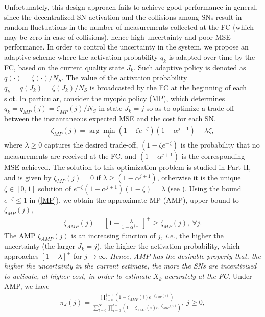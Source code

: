 \documentclass[10pt,twocolumn,twoside]{IEEEtran}
\theoremstyle{plain}
\begin{document}
 
 Unfortunately, this design approach
 fails to achieve good performance in general,
since the decentralized SN activation and the collisions among SNs result in
random fluctuations in the number of measurements collected at the FC (which may be zero in case of collisions),
hence high uncertainty and poor MSE performance.
In order to control the uncertainty in the system, we propose an adaptive scheme
   where the activation probability $q_k$ is adapted over time by the FC, based on the current quality
  state $J_k$. Such adaptive policy is denoted as $q(\cdot){=}\zeta(\cdot)/N_S$.
    The value of the activation probability $q_k{=}q(J_k){=}\zeta(J_k)/N_S$ is broadcasted by the FC at the beginning of each slot.
    In particular, consider the myopic policy (MP), which 
   determines $q_k{=}q_{MP}(j){=}\zeta_{MP}(j)/N_S$ in state $J_k{=}j$ so as to 
    optimize a trade-off between the instantaneous 
    expected MSE and the cost for each SN,
    \begin{align}
    \label{MP}
 \zeta_{MP}(j)=\arg\min_\zeta (1-\zeta e^{-\zeta})(1-\alpha^{j+1})+\lambda\zeta,
    \end{align}
    where $\lambda{\geq}0$ captures the desired trade-off, $(1{-}\zeta e^{-\zeta})$ is the probability that 
    no measurements are received at the FC, and $(1{-}\alpha^{j+1})$ is the corresponding MSE achieved.
    The solution to this optimization problem is studied in Part II, and is given by
    $\zeta_{MP}(j){=}0$ if  $\lambda{\geq}(1{-}\alpha^{j+1})$,
    otherwise it is the unique $\zeta\in[0,1]$ solution of
    $e^{-\zeta}(1{-}\alpha^{j+1})(1{-}\zeta){=}\lambda$ (see  \cite[Corollary~2]{MichelusiP2}).    
    Using the bound $e^{-\zeta}{\leq}1$ in (\ref{MP}),
    we obtain the approximate MP (AMP), upper bound to $\zeta_{MP}(j)$,
    \begin{align}
    \label{AMP}
  \zeta_{AMP}(j)=\left[1-\frac{\lambda}{1-\alpha^{j+1}}\right]^+\geq \zeta_{MP}(j),\ \forall j.
    \end{align}
The AMP
    $\zeta_{AMP}(j)$ is an increasing function of $j$, 
    \emph{i.e.}, the higher the uncertainty (the larger $J_k{=}j$), the higher the activation probability,
    which approaches $\left[1-\lambda\right]^+$ for $j\to\infty$.
\emph{Hence, AMP has the desirable property that,
the higher the uncertainty in the current estimate, the more the SNs are 
incentivized to activate, at higher cost, in order to estimate $X_k$ accurately at the FC.}
Under AMP, we have
    \begin{align}
        \pi_J(j)=\frac{\prod_{i=0}^{j-1}(1-\zeta_{AMP}(i) e^{-\zeta_{AMP}(i)})}{
        \sum_{l=0}^{\infty}\prod_{i=0}^{l-1}(1-\zeta_{AMP}(i) e^{-\zeta_{AMP}(i)})
        },\ j\geq 0,
    \end{align}
\end{document}
